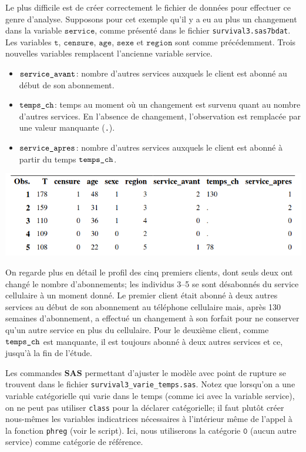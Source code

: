 \documentclass[
  11pt,
  letterpaper,
]{book}
\providecommand{\tightlist}{%
  \setlength{\itemsep}{0pt}\setlength{\parskip}{0pt}}
\theoremstyle{definition}
\theoremstyle{definition}
\theoremstyle{definition}
\theoremstyle{definition}
\theoremstyle{remark}
\begin{document}
Le plus difficile est de créer correctement le fichier de données pour effectuer ce genre d'analyse. Supposons pour cet exemple qu'il y a eu au plus un changement dans la variable \(\texttt{service}\), comme présenté dans le fichier \texttt{survival3.sas7bdat}. Les variables \(\texttt{t}\), \(\texttt{censure}\), \(\texttt{age}\), \(\texttt{sexe}\) et \(\texttt{region}\) sont comme précédemment. Trois nouvelles variables remplacent l'ancienne variable service.

\begin{itemize}
\tightlist
\item
  \(\verb+service_avant+\): nombre d'autres services auxquels le client est abonné au début de son abonnement.
\item
  \(\verb+temps_ch+\): temps au moment où un changement est survenu quant au nombre d'autres services. En l'absence de changement, l'observation est remplacée par une valeur manquante (\texttt{.}).
\item
  \(\verb+service_apres+\): nombre d'autres services auxquels le client est abonné à partir du temps \(\verb+temps_ch+\).
\end{itemize}

\begin{center}\includegraphics[width=0.8\linewidth]{figures/05-survie-e21} \end{center}

On regarde plus en détail le profil des cinq premiers clients, dont seuls deux ont changé le nombre d'abonnements; les individus 3--5 se sont désabonnés du service cellulaire à un moment donné. Le premier client était abonné à deux autres services au début de son abonnement au téléphone cellulaire mais, après 130 semaines d'abonnement, a effectué un changement à son forfait pour ne conserver qu'un autre service en plus du cellulaire. Pour le deuxième client, comme \(\verb+temps_ch+\) est manquante, il est toujours abonné à deux autres services et ce, jusqu'à la fin de l'étude.

Les commandes \textbf{SAS} permettant d'ajuster le modèle avec point de rupture se trouvent dans le fichier \texttt{survival3\_varie\_temps.sas}. Notez que lorsqu'on a une variable catégorielle qui varie dans le temps (comme ici avec la variable service), on ne peut pas utiliser \texttt{class} pour la déclarer catégorielle; il faut plutôt créer nous-mêmes les variables indicatrices nécessaires à l'intérieur même de l'appel à la fonction \texttt{phreg} (voir le script). Ici, nous utiliserons la catégorie \(\texttt{0}\) (aucun autre service) comme catégorie de référence.
\end{document}
